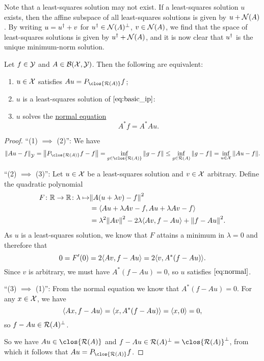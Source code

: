 Note that a least-squares solution may not exist. If a least-squares solution $u$ exists, then the affine subspace of all least-squares solutions is given by $u + \operatorname{\mathcal N}(A)$. By writing $u = u^\dagger + v$ for $u^\dagger \in \operatorname{\mathcal N}(A)^\perp$, $v \in \operatorname{\mathcal N}(A)$, we find that the space of least-squares solutions is given by $u^\dagger + \operatorname{\mathcal N}(A)$, and it is now clear that $u^\dagger$ is the unique minimum-norm solution. 

\begin{theorem}
    Let $f \in \mathcal Y$ and $A \in \mathcal B(\mathcal X, \mathcal Y)$. Then the following are equivalent:
    \begin{enumerate}
        \item $u \in \mathcal X$ satisfies $Au = P_{\clos{\Ran(A)} }f$;
        \item $u$ is a least-squares solution of $\cref{eq:basic_ip}$:
        \item $u$ solves the \uline{normal equation}
        \begin{equation} \label{eq:normal}
                   A^* f = A^* A u. 
        \end{equation}
    \end{enumerate}
\end{theorem}

\begin{proof}
     ``(1) $\implies$ (2)'': We have
     \[
     \norm{Au - f}_\YY = \norm{ P_{\clos{\Ran(A)} }f - f} = \inf_{g \in \clos{\Ran(A)}} \norm{g - f} \leq \inf_{g \in \Ran(A)} \norm{g - f} = \inf_{u \in \XX} \norm{Au - f}. 
     \]
     
     ``(2) $\implies$ (3)'':  Let $u \in \mathcal X$ be a least-squares solution and $v \in \mathcal X$ arbitrary. Define the quadratic polynomial 
     \begin{align*}
     F \colon \mathbb R \to \mathbb R \colon \lambda \mapsto & \norm{A(u + \lambda v) - f}^2 \\
     &= \langle Au + \lambda Av - f, Au + \lambda Av - f\rangle \\
     &= \lambda^2 \norm{Av}^2 - 2\lambda \langle Av, f - Au\rangle + \norm{f - Au}^2. 
     \end{align*}
    As $u$ is a least-squares solution, we know that $F$ attains a minimum in $\lambda =0 $ and therefore that 
    \[
    0 = F'(0) = 2\langle Av, f - Au\rangle = 2 \langle v, A^*(f - Au)\rangle.
    \]
    Since $v$ is arbitrary, we must have $A^*(f - Au) = 0$, so $u$ satisfies $\cref{eq:normal}$. 
    
    ``(3) $\implies$ (1)'':  From the normal equation we know that $A^*(f - Au) = 0$. For any $x \in \mathcal X$, we have
    \[
    \langle Ax, f - Au\rangle = \langle x, A^*(f - Au)\rangle = \langle x, 0\rangle = 0,
    \]
    so $f - Au \in \operatorname{\mathcal R}(A)^\perp$. 
    
    So we have $Au \in \clos{\Ran(A)}$ and $f - Au \in \Ran(A)\P = \clos{\Ran(A)}\P$, from which it follows that $Au = P_{\clos{\Ran(A)}}f$. 
\end{proof}

